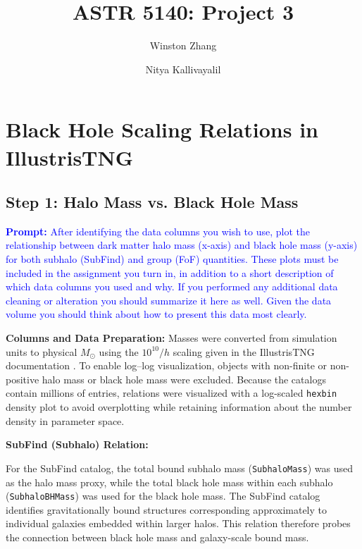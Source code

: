 \documentclass[twocolumn]{aastex631}
\begin{document}
\title{ASTR 5140: Project 3}

\author[0009-0004-8200-9910]{Winston Zhang}

\author{Nitya Kallivayalil}

\clearpage
{}

\section{Black Hole Scaling Relations in IllustrisTNG}

\subsection{Step 1: Halo Mass vs. Black Hole Mass}

\textcolor{blue}{\textbf{Prompt:} After identifying the data columns you wish to use, plot the relationship between dark matter halo mass (x-axis) and black hole mass (y-axis) for both subhalo (SubFind) and group (FoF) quantities.
These plots must be included in the assignment you turn in, in addition to a short description of which
data columns you used and why. If you performed any additional data cleaning or alteration you should
summarize it here as well. Given the data volume you should think about how to present this data most
clearly.}

\textbf{Columns and Data Preparation:}
Masses were converted from simulation units to physical $M_\odot$ using the $10^{10}/h$ scaling given in the IllustrisTNG documentation \citep{IllustrisTNG_Documentation}. To enable log--log visualization, objects with non-finite or non-positive halo mass or black hole mass were excluded. Because the catalogs contain millions of entries, relations were visualized with a log-scaled \texttt{hexbin} density plot to avoid overplotting while retaining information about the number density in parameter space.

\textbf{SubFind (Subhalo) Relation:}

For the SubFind catalog, the total bound subhalo mass (\texttt{SubhaloMass}) was used as the halo mass proxy, while the total black hole mass within each subhalo (\texttt{SubhaloBHMass}) was used for the black hole mass. The SubFind catalog identifies gravitationally bound structures corresponding approximately to individual galaxies embedded within larger halos. This relation therefore probes the connection between black hole mass and galaxy-scale bound mass.
\end{document}
